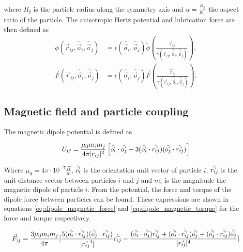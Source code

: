 where $R_{\parallel}$ is the particle radius along the
symmetry axis and $\alpha=\frac{R_{\parallel}}{R_{\perp}}$ the aspect
ratio of the particle. The anisotropic Hertz potential and lubrication
force are then defined as
%
\begin{equation}
    \begin{split}
    \phi\left(\vec{r}_{ij}, \hat{\vec{o}}_i, \hat{\vec{o}}_j\right) &= \epsilon\left(\hat{\vec{o}}_i, \hat{\vec{o}}_j\right) \tilde{\phi}\left(\frac{\vec{r}_{ij}}{\gamma\left(\vec{r}_{ij}, \hat{\vec{o}}_i, \hat{\vec{o}}_j\right)} \right) , \\
    \vec{F}\left(\vec{r}_{ij}, \hat{\vec{o}}_i, \hat{\vec{o}}_j\right) &= \epsilon\left(\hat{\vec{o}}_i, \hat{\vec{o}}_j\right) \tilde{\vec{F}}\left(\frac{\vec{r}_{ij}}{\gamma\left(\vec{r}_{ij}, \hat{\vec{o}}_i, \hat{\vec{o}}_j\right)} \right) .
    \end{split}
\end{equation}

\subsection{Magnetic field and particle coupling}
\label{section:lbm_colloids_magnetics}

The magnetic dipole potential is defined as

\begin{equation}
    U_{ij} = \frac{\mu_0 m_i m_j}{4\pi |r_{ij}|^{3}} \left[ \Hat{\vec{o_i}}\cdot \Hat{\vec{o_j}} - 
    3(\Hat{\vec{o_i}} \cdot \Hat{\vec{r_{ij}}})(\Hat{\vec{o_j}} \cdot \Hat{\vec{r_{ij}}}) \right]
    \label{eq:magnet_potential}
\end{equation}

Where $\mu_0 = 4\pi \cdot 10^{-7} \frac{H}{m}$,  $\Hat{\vec{o_i}}$ is the orientation unit vector of particle 
$i$, $\Hat{\vec{r_{ij}}}$ is the unit distance vector between particles $i$ and $j$ and $m_i$ is the magnitude the 
magnetic dipole of particle $i$. From the potential, the force and torque of the dipole force between particles 
can be found. These expressions are shown in equations \ref{eq:dipole_magnetic_force} and \ref{eq:dipole_magnetic_torque} 
for the force and torque respectively.

\begin{equation}
    \vec{F}_{ij} = \frac{3 \mu_0 m_i m_j}{4 \pi} [\frac{5( \Hat{\vec{o_i}} \cdot \Hat{\vec{r_{ij}}} )(\Hat{\vec{o_j}}
    \cdot \Hat{\vec{r_{ij}}})}{|\vec{r_{ij}}^4|}\Hat{\vec{r_{ij}}} - \frac{(\Hat{\vec{o_i}} \cdot \Hat{\vec{o_j}})\Hat{\vec{r_{ij}}} + 
    (\Hat{\vec{o_i}} \cdot \Hat{\vec{r_{ij}}})\Hat{\vec{o_j}} + (\Hat{\vec{o_j}} \cdot \Hat{\vec{r_{ij}}})\Hat{\vec{o_j}} }{|\vec{r_{ij}}|^4}]
\label{eq:dipole_magnetic_force}
\end{equation}

